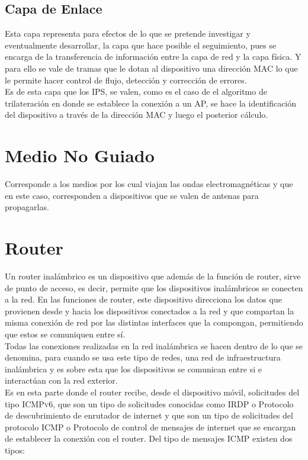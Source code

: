 \subsection{Capa de Enlace}
Esta capa representa para efectos de lo que se pretende investigar y eventualmente desarrollar, la capa que hace posible el seguimiento, pues se encarga de la transferencia de información entre la capa de red y la capa física. Y para ello se vale de tramas que le dotan al dispositivo una dirección \ac{MAC} lo que le permite hacer control de flujo, detección y corrección de errores.\\

Es de esta capa que los IPS, se valen, como es el caso de el algoritmo de trilateración en donde se establece la conexión a un AP, se hace la identificación del dispositivo a través de la dirección MAC y luego el posterior cálculo.

\section{Medio No Guiado}

Corresponde a los medios por los cual viajan las ondas electromagnéticas y que en este caso, corresponden a dispositivos que se valen de antenas para propagarlas.

\section{Router}

Un router inalámbrico es un dispositivo que además de la función de router, sirve de punto de acceso, es decir, permite que los dispositivos inalámbricos se conecten a la red. En las funciones de router, este dispositivo direcciona los datos que provienen desde y hacia los dispositivos conectados a la red y que compartan la misma conexión de red por las distintas interfaces que la compongan, permitiendo que estos se comuniquen entre sí.\\

Todas las conexiones realizadas en la red inalámbrica se hacen dentro de lo que se denomina, para cuando se usa este tipo de redes, una red de infraestructura inalámbrica y es sobre esta que los dispositivos se comunican entre si e interactúan con la red exterior.\\

Es en esta parte donde el router recibe, desde el dispositivo móvil, solicitudes del tipo \textsc{ICMPv6}, que son un tipo de solicitudes conocidas como \ac{IRDP}  o Protocolo de descubrimiento de enrutador de internet y que son un tipo de solicitudes del protocolo \ac{ICMP} o Protocolo de control de mensajes de internet que se encargan de establecer la conexión con el router. Del tipo de mensajes ICMP existen dos tipos:\\

